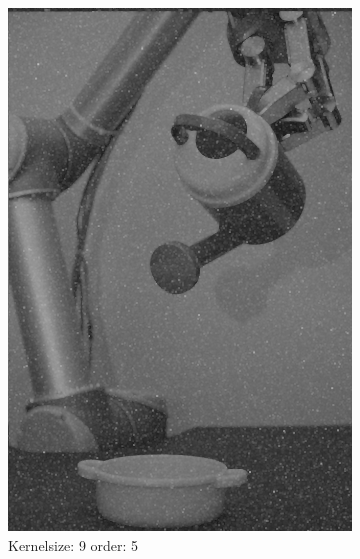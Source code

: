 \begin{figure}[H]
\begin{subfigure}[b]{0.3\textwidth}
        \includegraphics[width=\textwidth]{img1/img_1_gaus_9_5.png}
        \caption{Kernelsize: 9 order: 5}
         \label{fig:img1_contra9_5}
    \end{subfigure}
       \begin{subfigure}[b]{0.3\textwidth}

\end{subfigure}
\end{figure}
